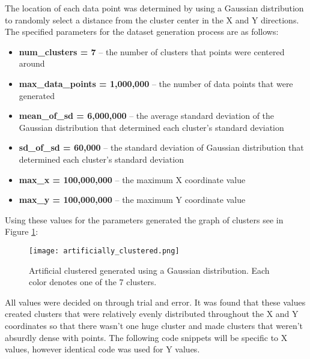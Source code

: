 \documentclass[9pt,twocolumn,twoside]{idsi}
\begin{document}
The location of each data point was determined by using a Gaussian distribution to randomly select a distance from the cluster center in the X and Y directions. The specified parameters for the dataset generation process are as follows:

\begin{itemize}
  \item \textbf{num\_clusters = 7} -- the number of clusters that points were centered around
  \item \textbf{max\_data\_points = 1,000,000} -- the number of data points that were generated
  \item \textbf{mean\_of\_sd = 6,000,000} -- the average standard deviation of the Gaussian distribution that determined each cluster's standard deviation
  \item \textbf{sd\_of\_sd = 60,000} -- the standard deviation of Gaussian distribution that determined each cluster's standard deviation
  \item \textbf{max\_x = 100,000,000} -- the maximum X coordinate value
  \item \textbf{max\_y = 100,000,000} -- the maximum Y coordinate value
\end{itemize}
Using these values for the parameters generated the graph of clusters see in Figure \ref{fig:artificial_clusters}:
\begin{figure}[htbp] 
\centering
\texttt{[image: artificially\_clustered.png]}
\caption{Artificial clustered generated using a Gaussian distribution. Each color denotes one of the 7 clusters.}
\label{fig:artificial_clusters}
\end{figure}

All values were decided on through trial and error. It was found that these values created clusters that were relatively evenly distributed throughout the X and Y coordinates so that there wasn't one huge cluster and made clusters that weren't absurdly dense with points. The following code snippets will be specific to X values, however identical code was used for Y values.
\end{document}
